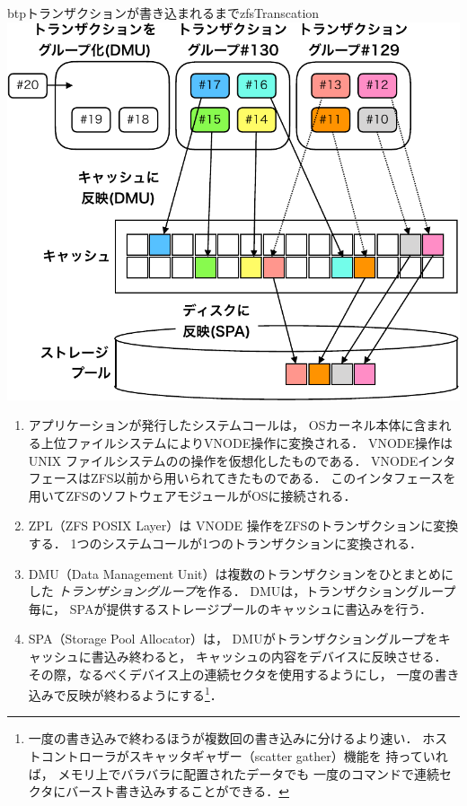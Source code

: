 \begin{myfig}{btp}{トランザクションが書き込まれるまで}{zfsTranscation}
  \centering\includegraphics[scale=0.65]{Fig/zfsTranscation-crop.pdf}
\end{myfig}
  
\begin{enumerate}
\item アプリケーションが発行したシステムコールは，
  OSカーネル本体に含まれる上位ファイルシステムによりVNODE操作に変換される．
  VNODE操作は UNIX ファイルシステムの\inode の操作を仮想化したものである．
  VNODEインタフェースはZFS以前から用いられてきたものである．
  このインタフェースを用いてZFSのソフトウェアモジュールがOSに接続される．

\item ZPL（ZFS POSIX Layer）は VNODE 操作をZFSのトランザクションに変換する．
  1つのシステムコールが1つのトランザクションに変換される．

\item DMU（Data Management Unit）は複数のトランザクションをひとまとめにした
  \emph{トランザショングループ}を作る．
  DMUは，トランザクショングループ毎に，
  SPAが提供するストレージプールのキャッシュに書込みを行う．

\item SPA（Storage Pool Allocator）は，
  DMUがトランザクショングループをキャッシュに書込み終わると，
  キャッシュの内容をデバイスに反映させる．
  その際，なるべくデバイス上の連続セクタを使用するようにし，
  一度の書き込みで反映が終わるようにする\footnote{
    一度の書き込みで終わるほうが複数回の書き込みに分けるより速い．
    ホストコントローラがスキャッタギャザー（scatter gather）機能を
    持っていれば，
    メモリ上でバラバラに配置されたデータでも
    一度のコマンドで連続セクタにバースト書き込みすることができる．
  }．
\end{enumerate}

